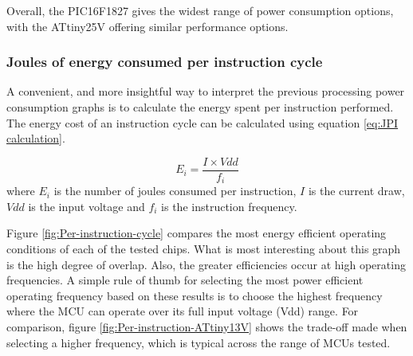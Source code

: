       Overall, the PIC16F1827 gives the widest range of power consumption options, with the ATtiny25V offering similar performance options.

    \subsubsection*{Joules of energy consumed per instruction cycle\label{sub:Joules-of-energy}}

      A convenient, and more insightful way to interpret the previous processing power consumption graphs is to calculate the energy spent per instruction performed.
      The energy cost of an instruction cycle can be calculated using equation \ref{eq:JPI calculation}.

      \begin{equation}
      E_{i}=\frac{I\times Vdd}{f_{i}}\label{eq:JPI calculation}
      \end{equation}
      where $E_{i}$ is the number of joules consumed per instruction, $I$ is the current draw, $Vdd$ is the input voltage and $f_{i}$ is the instruction frequency.

      Figure \ref{fig:Per-instruction-cycle} compares the most energy efficient operating conditions of each of the tested chips.
      What is most interesting about this graph is the high degree of overlap.
      Also, the greater efficiencies occur at high operating frequencies.
      A simple rule of thumb for selecting the most power efficient operating frequency based on these results is to choose the highest frequency where the MCU can operate over its full input voltage (Vdd) range.
      For comparison, figure \ref{fig:Per-instruction-ATtiny13V} shows the trade-off made when selecting a higher frequency, which is typical across the range of MCUs tested.

